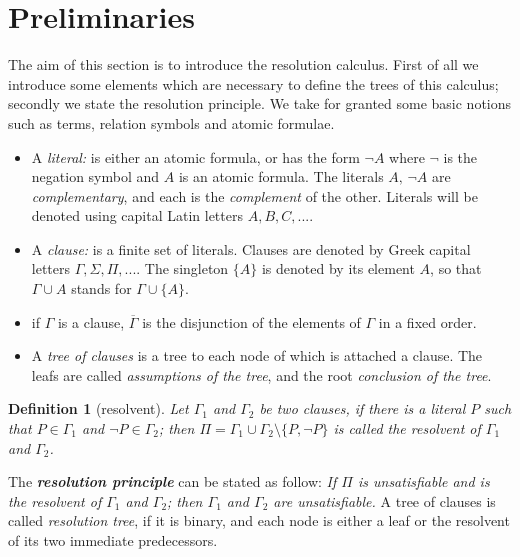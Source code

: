\documentclass[a4paper,12pt,oneside]{book}
\newtheorem{definition}[theorem]{Definition}
\begin{document}
\section{Preliminaries}
The aim of this section is to introduce the resolution calculus. First of all we introduce some elements which are necessary to define the trees of this calculus; secondly we state the resolution principle. We take for granted some basic notions such as terms, relation symbols and atomic formulae. 
\begin{itemize}
\item A \textit{literal:} is either an atomic formula, or has the form $\neg A$ where $\neg$ is the negation symbol and $A$ is an atomic formula. The literals $A,\,\neg A$ are \textit{complementary}, and each is the \textit{complement} of the other. Literals will be denoted using capital Latin letters $A,B,C,...$.
\item A \textit{clause:} is a finite set of literals. Clauses are denoted by Greek capital letters $\Gamma,\Sigma ,\Pi,...$. The singleton $\{A\}$ is denoted by its element $A$, so that $\Gamma\cup A$ stands for $\Gamma\cup\{A\}$.
\item if $\Gamma$ is a clause, $\overline{\Gamma}$ is the disjunction of the elements of $\Gamma$ in a fixed order.
\item A \textit{tree of clauses} is a tree to each node of which is attached a clause. The leafs are called \textit{assumptions of the tree}, and the root \textit{conclusion of the tree}.
\end{itemize}

\begin{definition}[resolvent]
Let $\Gamma_1$ and $\Gamma_2$ be two clauses, if there is a literal $P$ such that $P\in\Gamma_1$ and $\neg P\in\Gamma_2$; then $\Pi =\Gamma_1\cup\Gamma_2\setminus\{P,\neg P\}$ is called the resolvent of $\Gamma_1$ and $\Gamma_2$.
\end{definition}
The \textit{\textbf{resolution principle}} can be stated as follow:
\textit{If $\Pi$ is unsatisfiable and is the resolvent of  $\Gamma_1$ and $\Gamma_2$; then  $\Gamma_1$ and $\Gamma_2$ are unsatisfiable.}
A tree of clauses is called \textit{resolution tree}, if it is binary, and each node is either a leaf or the resolvent of its two immediate predecessors.
\end{document}
